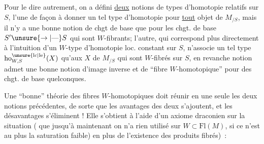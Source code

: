 
Pour le dire autrement, on a défini \uline{deux} notions de types d'homotopie relatifs sur $S$, l'une de façon à donner un tel type d'homotopie  pour \uline{tout} objet de $M_{/S}$, mais il n'y a  une bonne notion de chgt de base que pour les chgt. de base $S'\unsure{\to|\text{---}}S$ qui sont $W$-fibrants; l'autre, qui correspond plus directement à l'intuition d'un $W$-type d'homotopie loc. constant sur $S$, n'associe un tel type $\mathrm{ho}^{\unsure{\mathrm{lc}|\mathrm{le}}}_{W,S}(X)$ qu'aux $X$ de $M_{/S}$ qui sont $W$-fibrés sur $S$, en revanche  notion admet une bonne notion d'image inverse et de ``fibre $W$-homotopique'' pour des chgt. de base quelconques.

Une ``bonne'' théorie des fibres $W$-homotopiques doit réunir en une seule les deux notions précédentes, de sorte que les avantages des deux s'ajoutent, et les désavantages s'éliminent ! Elle s'obtient à l'aide d'un axiome draconien sur la situation ( que jusqu'à maintenant on n'a rien utilisé sur $W\subset\mathrm{Fl}(M)$, si ce n'est  au plus la saturation faible) \unsure{,|;} en plus de l'existence des produits fibrés)~:
